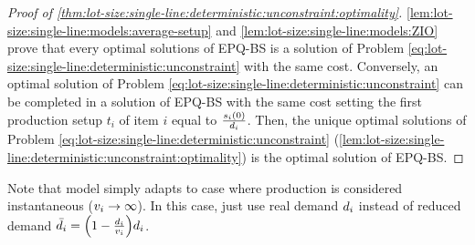 \begin{proof}[Proof of \cref{thm:lot-size:single-line:deterministic:unconstraint:optimality}]
\cref{lem:lot-size:single-line:models:average-setup} and \cref{lem:lot-size:single-line:models:ZIO} prove that every optimal solutions of EPQ-BS is a solution of Problem \ref{eq:lot-size:single-line:deterministic:unconstraint} with the same cost.
Conversely, an optimal solution of Problem \ref{eq:lot-size:single-line:deterministic:unconstraint} can be completed in a solution of EPQ-BS with the same cost setting the first production setup $t_i$ of item $i$ equal to $\frac{s_i(0)}{d_i}$.
Then, the unique optimal solutions of Problem \ref{eq:lot-size:single-line:deterministic:unconstraint} (\cref{lem:lot-size:single-line:deterministic:unconstraint:optimality}) is the optimal solution of EPQ-BS.
\end{proof}


\medskip


Note that model simply adapts to case where production is considered instantaneous (\ie $v_i\rightarrow\infty$).
In this case, just use real demand $d_i$ instead of reduced demand $\bar{\demand}_i=\bracket{1-\frac{\demand_i}{\rate_i}}\demand_i$.










